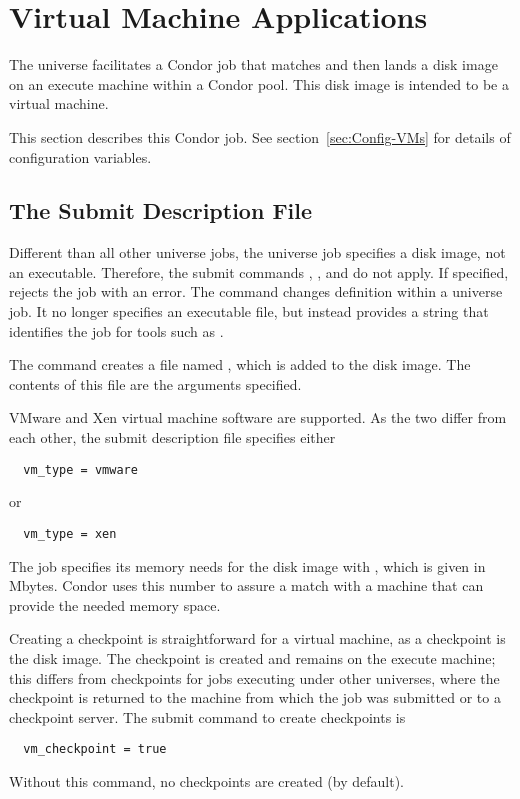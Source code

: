 \section{\label{sec:vmuniverse}Virtual Machine Applications}

The  universe facilitates a Condor job
that matches and then lands a disk image on an execute machine
within a Condor pool.
This disk image is intended to be a virtual machine.

This section describes this Condor job.
See section~\ref{sec:Config-VMs}
for details of configuration variables.

\subsection{\label{sec:vm-submitfile}The Submit Description File}

Different than all other universe jobs,
the  universe job specifies a disk image,
not an executable.
Therefore, the submit commands , ,
and  do not apply.
If specified,  rejects the job with an error.
The  command changes definition within a
 universe job.
It no longer specifies an executable file, but instead
provides a string that identifies the job for tools such
as .

The  command creates a file named ,
which is added to the disk image.
The contents of this file are the arguments specified.

VMware and Xen virtual machine software are supported.
As the two differ from each other, the submit description file
specifies either
\begin{verbatim}
  vm_type = vmware
\end{verbatim}
or
\begin{verbatim}
  vm_type = xen
\end{verbatim}

The job specifies its memory needs 
for the disk image with ,
which is given in Mbytes.
Condor uses this number to assure a match with a machine
that can provide the needed memory space.

Creating a checkpoint is straightforward for a virtual machine,
as a checkpoint is the disk image.
The checkpoint is created and remains on the execute machine;
this differs from checkpoints for jobs executing under other
universes, where the checkpoint is returned to the machine
from which the job was submitted or to a checkpoint server.
The submit command to create checkpoints is
\begin{verbatim}
  vm_checkpoint = true
\end{verbatim}
Without this command, no checkpoints are created (by default).


